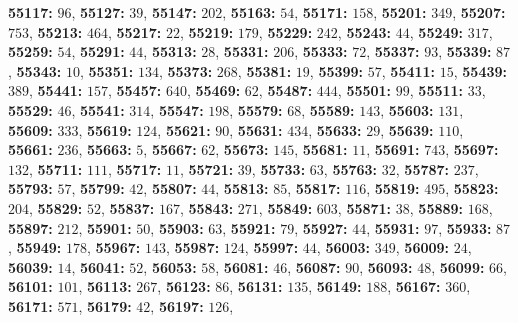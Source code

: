 \textsf{\bfseries 55117:} $96$, \textsf{\bfseries 55127:} $39$, \textsf{\bfseries 55147:} $202$, \textsf{\bfseries 55163:} $54$, \textsf{\bfseries 55171:} $158$, \textsf{\bfseries 55201:} $349$, \textsf{\bfseries 55207:} $753$, \textsf{\bfseries 55213:} $464$, \textsf{\bfseries 55217:} $22$, \textsf{\bfseries 55219:} $179$, \textsf{\bfseries 55229:} $242$, \textsf{\bfseries 55243:} $44$, \textsf{\bfseries 55249:} $317$, \textsf{\bfseries 55259:} $54$, \textsf{\bfseries 55291:} $44$, \textsf{\bfseries 55313:} $28$, \textsf{\bfseries 55331:} $206$, \textsf{\bfseries 55333:} $72$, \textsf{\bfseries 55337:} $93$, \textsf{\bfseries 55339:} $87$, \textsf{\bfseries 55343:} $10$, \textsf{\bfseries 55351:} $134$, \textsf{\bfseries 55373:} $268$, \textsf{\bfseries 55381:} $19$, \textsf{\bfseries 55399:} $57$, \textsf{\bfseries 55411:} $15$, \textsf{\bfseries 55439:} $389$, \textsf{\bfseries 55441:} $157$, \textsf{\bfseries 55457:} $640$, \textsf{\bfseries 55469:} $62$, \textsf{\bfseries 55487:} $444$, \textsf{\bfseries 55501:} $99$, \textsf{\bfseries 55511:} $33$, \textsf{\bfseries 55529:} $46$, \textsf{\bfseries 55541:} $314$, \textsf{\bfseries 55547:} $198$, \textsf{\bfseries 55579:} $68$, \textsf{\bfseries 55589:} $143$, \textsf{\bfseries 55603:} $131$, \textsf{\bfseries 55609:} $333$, \textsf{\bfseries 55619:} $124$, \textsf{\bfseries 55621:} $90$, \textsf{\bfseries 55631:} $434$, \textsf{\bfseries 55633:} $29$, \textsf{\bfseries 55639:} $110$, \textsf{\bfseries 55661:} $236$, \textsf{\bfseries 55663:} $5$, \textsf{\bfseries 55667:} $62$, \textsf{\bfseries 55673:} $145$, \textsf{\bfseries 55681:} $11$, \textsf{\bfseries 55691:} $743$, \textsf{\bfseries 55697:} $132$, \textsf{\bfseries 55711:} $111$, \textsf{\bfseries 55717:} $11$, \textsf{\bfseries 55721:} $39$, \textsf{\bfseries 55733:} $63$, \textsf{\bfseries 55763:} $32$, \textsf{\bfseries 55787:} $237$, \textsf{\bfseries 55793:} $57$, \textsf{\bfseries 55799:} $42$, \textsf{\bfseries 55807:} $44$, \textsf{\bfseries 55813:} $85$, \textsf{\bfseries 55817:} $116$, \textsf{\bfseries 55819:} $495$, \textsf{\bfseries 55823:} $204$, \textsf{\bfseries 55829:} $52$, \textsf{\bfseries 55837:} $167$, \textsf{\bfseries 55843:} $271$, \textsf{\bfseries 55849:} $603$, \textsf{\bfseries 55871:} $38$, \textsf{\bfseries 55889:} $168$, \textsf{\bfseries 55897:} $212$, \textsf{\bfseries 55901:} $50$, \textsf{\bfseries 55903:} $63$, \textsf{\bfseries 55921:} $79$, \textsf{\bfseries 55927:} $44$, \textsf{\bfseries 55931:} $97$, \textsf{\bfseries 55933:} $87$, \textsf{\bfseries 55949:} $178$, \textsf{\bfseries 55967:} $143$, \textsf{\bfseries 55987:} $124$, \textsf{\bfseries 55997:} $44$, \textsf{\bfseries 56003:} $349$, \textsf{\bfseries 56009:} $24$, \textsf{\bfseries 56039:} $14$, \textsf{\bfseries 56041:} $52$, \textsf{\bfseries 56053:} $58$, \textsf{\bfseries 56081:} $46$, \textsf{\bfseries 56087:} $90$, \textsf{\bfseries 56093:} $48$, \textsf{\bfseries 56099:} $66$, \textsf{\bfseries 56101:} $101$, \textsf{\bfseries 56113:} $267$, \textsf{\bfseries 56123:} $86$, \textsf{\bfseries 56131:} $135$, \textsf{\bfseries 56149:} $188$, \textsf{\bfseries 56167:} $360$, \textsf{\bfseries 56171:} $571$, \textsf{\bfseries 56179:} $42$, \textsf{\bfseries 56197:} $126$, 
